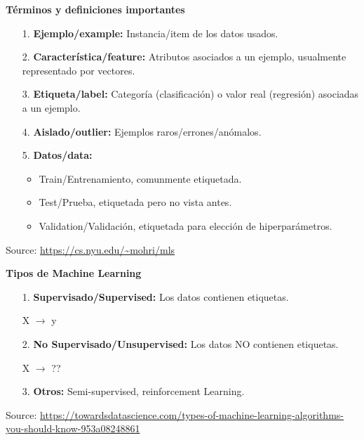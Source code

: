 \documentclass[english,svgnames,notes=hide,12pt]{beamer}
\begin{document}
\begin{frame}
    \textbf{Términos y definiciones importantes}
    \begin{itemize}
        \item[\small{1.}] \textbf{Ejemplo/example:} Instancia/item de los datos usados.
        \item[\small{2.}] \textbf{Característica/feature:} Atributos asociados a un ejemplo, usualmente representado por vectores.
        \item[\small{3.}] \textbf{Etiqueta/label:} Categoría (clasificación) o valor real (regresión) asociadas a un ejemplo.
        \item[\small{4.}] \textbf{Aislado/outlier:} Ejemplos raros/errones/anómalos.
        \item[\small{5.}] \textbf{Datos/data:}
                \begin{itemize}
                    \item Train/Entrenamiento, comunmente etiquetada.
                    \item Test/Prueba, etiquetada pero no vista antes.
                    \item Validation/Validación, etiquetada para elección de hiperparámetros.
                \end{itemize}
    \end{itemize}

    \tiny{Source: \url{https://cs.nyu.edu/~mohri/mls}}
\end{frame}


\begin{frame}
    \textbf{Tipos de Machine Learning}
    \begin{itemize}
        \item[\small{1.}] \textbf{Supervisado/Supervised:} Los datos contienen etiquetas.
        
        X $\rightarrow$ y
        \item[\small{2.}] \textbf{No Supervisado/Unsupervised:} Los datos NO contienen etiquetas.
        
        X $\rightarrow$ ??
        \item[\small{3.}] \textbf{Otros:} Semi-supervised, reinforcement Learning.
    \end{itemize}

    \tiny{Source: \url{https://towardsdatascience.com/types-of-machine-learning-algorithms-you-should-know-953a08248861}}
\end{frame}
\end{document}

